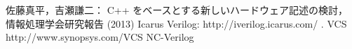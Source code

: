 \begin{thebibliography}{99}
   佐藤真平，吉瀬謙二：
   C++ をベースとする新しいハードウェア記述の検討，
   情報処理学会研究報告 (2013)
   Icarus Verilog: http://iverilog.icarus.com/ .
   VCS http://www.synopsys.com/VCS
   NC-Verilog
\end{thebibliography}
